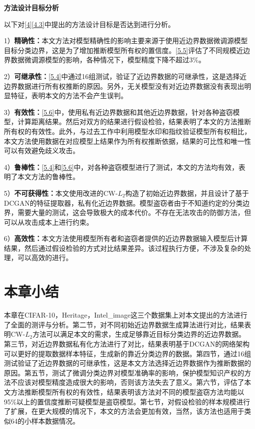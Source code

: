 \textbf{方法设计目标分析}

以下对\ref{4}\ref{4.3}中提出的方法设计目标是否达到进行分析。

1）\textbf{精确性：}本文方法对模型精确性的影响主要来源于使用近边界数据微调源模型目标分类边界，这是为了增加推断模型所有权的置信度。\ref{5.5}评估了不同规模近边界数据微调源模型的影响，各种情况下，模型精度下降不超过3\%。

2）\textbf{可继承性：}\ref{5.4}中通过16组测试，验证了近边界数据的可继承性，这是选择近边界数据进行所有权推断的原因。另外，无关模型没有对近边界数据没有表现出明显特征，表明本文的方法不会产生误判。

3）\textbf{有效性：}\ref{5.6}中，使用私有近边界数据和其他近边界数据，针对各种盗窃模型，计算距离结果。然后对双方的结果进行假设检验，结果表明了本文的方法推断所有权的有效性。此外，与过去工作中利用模型水印和指纹验证模型所有权相比，本文方法使用数据在对应模型上结果作为所有权推断依据，结果的可比性和唯一性可以有效避免歧义攻击。

4）\textbf{鲁棒性：}\ref{5.4}和\ref{5.6}中，对各种盗窃模型进行了测试，本文的方法均有效，表明了本文方法的鲁棒性。

5）\textbf{不可获得性：}本文使用改进的CW-$L_2$构造了初始近边界数据，并且设计了基于DCGAN的特征提取器，私有化近边界数据。模型盗窃者由于不知道约定的分类边界，需要大量的测试，这会导致极大的成本代价。不存在无法攻击的防御方法，但可以从攻击成本上进行约束。

6）\textbf{高效性：}本文方法使用模型所有者和盗窃者提供的近边界数据输入模型后计算结果，然后通过假设检验的方式对比结果差异。该过程执行方便，不涉及复杂的处理，可以高效的进行。

\section{本章小结}

本章在CIFAR-10，Heritage，Intel\_image这三个数据集上对本文提出的方法进行了全面的测评与分析。第二节，对不同初始近边界数据生成算法进行对比，结果表明CW-$L_2$方法可以满足本文的需求，生成足够靠近目标分类边界的近边界数据。第三节，对近边界数据私有化方法进行了对比，结果表明基于DCGAN的网络架构可以更好的提取数据样本特征，生成新的靠近分类边界的数据。第四节，通过16组测试验证了近边界数据的可继承性，这是本文方法选择近边界数据作为推断数据的原因。第五节，测试了微调分类边界对模型准确率的影响，保护模型知识产权的方法不应该对模型精度造成很大的影响，否则该方法失去了意义。第六节，评估了本文方法推断模型所有权的有效性，结果表明该方法对不同的模型盗窃方法均能以95\%以上的置信度推断可疑模型是盗窃模型。第七节，对假设检验的样本规模进行了扩展，在更大规模的情况下，本文的方法会更加有效，当然，该方法也适用于类似64的小样本数据情况。

